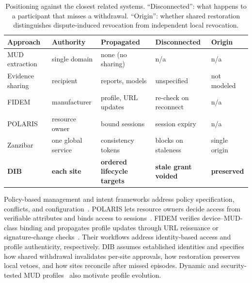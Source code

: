 \documentclass[journal]{IEEEtran}
\theoremstyle{definition}
\begin{document}
\begin{table}[t]
\centering
\caption{Positioning against the closest related systems. ``Disconnected'': what happens to a participant that misses a withdrawal. ``Origin'': whether shared restoration distinguishes dispute-induced revocation from independent local revocation.}
\label{tab:positioning}
\scriptsize
\setlength{\tabcolsep}{3pt}
\renewcommand{\arraystretch}{1.05}
\begin{tabular}{@{}>{\raggedright\arraybackslash}p{1.52cm}>{\raggedright\arraybackslash}p{1.32cm}>{\raggedright\arraybackslash}p{1.84cm}>{\raggedright\arraybackslash}p{1.56cm}>{\raggedright\arraybackslash}p{1.26cm}@{}}
\toprule
Approach & Authority & Propagated & Disconnected & Origin \\
\midrule
MUD extraction~\cite{clearasmud,hamzatdsc,mudscope} & single domain & none (no sharing) & n/a & n/a \\
Evidence sharing~\cite{wagner2016misp,stix21,colearn} & recipient & reports, models & unspecified & not modeled \\
FIDEM~\cite{fidem} & manufacturer & profile, URL updates & re-check on reconnect & n/a \\
POLARIS~\cite{polaris} & resource owner & bound sessions & session expiry & n/a \\
Zanzibar~\cite{zanzibar} & one global service & consistency tokens & blocks on staleness & single origin \\
\textbf{DIB} & \textbf{each site} & \textbf{ordered lifecycle targets} & \textbf{stale grant voided} & \textbf{preserved} \\
\bottomrule
\end{tabular}
\end{table}

Policy-based management and intent frameworks address policy specification, conflicts, and configuration~\cite{pbnm,rfc9315,alshaer2004firewall,chowdhary2022intent,pipeconf2022,vergutz2023data}. POLARIS lets resource owners decide access from verifiable attributes and binds access to sessions~\cite{polaris}. FIDEM verifies device--MUD-class binding and propagates profile updates through URL reissuance or signature-change checks~\cite{fidem}. Their workflows address identity-based access and profile authenticity, respectively. DIB assumes established identities and specifies how shared withdrawal invalidates per-site approvals, how restoration preserves local vetoes, and how sites reconcile after missed episodes. Dynamic and security-tested MUD profiles~\cite{blockchainmud,matheu2019mudtesting} also motivate profile evolution.
\end{document}
